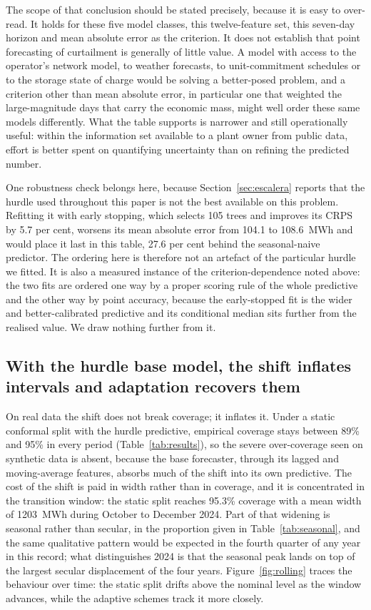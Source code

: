 \documentclass[preprint,3p,times]{elsarticle}
\begin{document}
The scope of that conclusion should be stated precisely, because it is easy to over-read. It holds for these five model classes, this twelve-feature set, this seven-day horizon and mean absolute error as the criterion. It does not establish that point forecasting of curtailment is generally of little value. A model with access to the operator's network model, to weather forecasts, to unit-commitment schedules or to the storage state of charge would be solving a better-posed problem, and a criterion other than mean absolute error, in particular one that weighted the large-magnitude days that carry the economic mass, might well order these same models differently. What the table supports is narrower and still operationally useful: within the information set available to a plant owner from public data, effort is better spent on quantifying uncertainty than on refining the predicted number.

One robustness check belongs here, because Section~\ref{sec:escalera} reports that the hurdle used throughout this paper is not the best available on this problem. Refitting it with early stopping, which selects 105 trees and improves its CRPS by 5.7 per cent, worsens its mean absolute error from 104.1 to 108.6~MWh and would place it last in this table, 27.6 per cent behind the seasonal-naive predictor. The ordering here is therefore not an artefact of the particular hurdle we fitted. It is also a measured instance of the criterion-dependence noted above: the two fits are ordered one way by a proper scoring rule of the whole predictive and the other way by point accuracy, because the early-stopped fit is the wider and better-calibrated predictive and its conditional median sits further from the realised value. We draw nothing further from it.



\subsection{With the hurdle base model, the shift inflates intervals and adaptation recovers them}
\label{sec:hurdle}

On real data the shift does not break coverage; it inflates it. Under a static conformal split with the hurdle predictive, empirical coverage stays between 89\% and 95\% in every period (Table~\ref{tab:results}), so the severe over-coverage seen on synthetic data is absent, because the base forecaster, through its lagged and moving-average features, absorbs much of the shift into its own predictive. The cost of the shift is paid in width rather than in coverage, and it is concentrated in the transition window: the static split reaches 95.3\% coverage with a mean width of 1203~MWh during October to December 2024. Part of that widening is seasonal rather than secular, in the proportion given in Table~\ref{tab:seasonal}, and the same qualitative pattern would be expected in the fourth quarter of any year in this record; what distinguishes 2024 is that the seasonal peak lands on top of the largest secular displacement of the four years. Figure~\ref{fig:rolling} traces the behaviour over time: the static split drifts above the nominal level as the window advances, while the adaptive schemes track it more closely.
\end{document}
